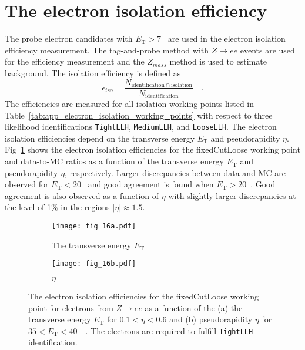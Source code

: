 
\section{The electron isolation efficiency}
\label{sec:app_electron_isolation_efficiency}
The probe electron candidates with $E_\mathrm{T} > 7$~{\GeV} are used in the electron isolation efficiency measurement.
The tag-and-probe method with $Z \to ee$ events are used for the efficiency measurement and the $Z_{mass}$ method is used to estimate background.
The isolation efficiency is defined as
%
\begin{equation}
    \epsilon_{iso} = \frac{N_{\mathrm{identification} \cap \mathrm{isolation}}}{N_\mathrm{identification}} \quad .
\end{equation}
%
The efficiencies are measured for all isolation working points listed in Table~\ref{tab:app_electron_isolation_working_points} with respect to three likelihood identifications \texttt{TightLLH}, \texttt{MediumLLH}, and \texttt{LooseLLH}.
The electron isolation efficiencies depend on the transverse energy $E_\mathrm{T}$ and pseudorapidity $\eta$.
Fig~\ref{fig:app_electron_isolation_isolation_plots} shows the electron isolation efficiencies for the fixedCutLoose working point and data-to-MC ratios as a function of the transverse energy $E_\mathrm{T}$ and pseudorapidity $\eta$, respectively.
Larger discrepancies between data and MC are observed for $E_\mathrm{T} < 20$~{\GeV} and good agreement is found when $E_\mathrm{T} > 20$~{\GeV}.
Good agreement is also observed as a function of $\eta$ with slightly larger discrepancies at the level of 1\% in the regions $|\eta| \approx 1.5$.

\begin{figure}[htbp]
    \begin{subfigure}[b]{0.48\textwidth}
        \begin{center}
            \texttt{[image: fig\_16a.pdf]}
            \caption{The transverse energy $E_\mathrm{T}$}
        \end{center}
    \end{subfigure}
    \begin{subfigure}[b]{0.48\textwidth}
        \begin{center}
            \texttt{[image: fig\_16b.pdf]}
            \caption{$\eta$}
        \end{center}
    \end{subfigure}
    \caption{The electron isolation efficiencies for the fixedCutLoose working point for electrons from $Z \to ee$ as a function of the (a) the transverse energy $E_\mathrm{T}$ for $0.1 < \eta < 0.6$ and (b) pseudorapidity $\eta$ for $35 < E_\mathrm{T} < 40$~{\GeV}~\cite{ATLAS:2016iqc}.
    The electrons are required to fulfill \texttt{TightLLH} identification.}
    \label{fig:app_electron_isolation_isolation_plots}
\end{figure}
